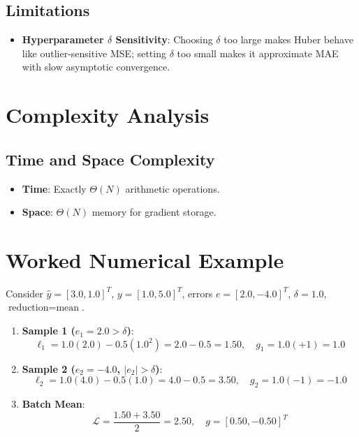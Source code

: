 \documentclass[11pt,a4paper]{article}
\theoremstyle{definition}
\begin{document}
\subsection{Limitations}
\begin{itemize}
    \item \textbf{Hyperparameter $\delta$ Sensitivity}: Choosing $\delta$ too large makes Huber behave like outlier-sensitive MSE; setting $\delta$ too small makes it approximate MAE with slow asymptotic convergence.
\end{itemize}

\section{Complexity Analysis}

\subsection{Time and Space Complexity}
\begin{itemize}
    \item \textbf{Time}: Exactly $\Theta(N)$ arithmetic operations.
    \item \textbf{Space}: $\Theta(N)$ memory for gradient storage.
\end{itemize}

\section{Worked Numerical Example}

Consider $\hat{y} = [3.0, 1.0]^T$, $y = [1.0, 5.0]^T$, errors $e = [2.0, -4.0]^T$, $\delta = 1.0$, $\text{reduction} = \text{mean}$.

\begin{enumerate}
    \item \textbf{Sample 1 ($e_1 = 2.0 > \delta$)}:
    \begin{equation}
    \ell_1 = 1.0(2.0) - 0.5(1.0^2) = 2.0 - 0.5 = 1.50, \quad g_1 = 1.0(+1) = 1.0
    \end{equation}
    \item \textbf{Sample 2 ($e_2 = -4.0$, $|e_2| > \delta$)}:
    \begin{equation}
    \ell_2 = 1.0(4.0) - 0.5(1.0) = 4.0 - 0.5 = 3.50, \quad g_2 = 1.0(-1) = -1.0
    \end{equation}
    \item \textbf{Batch Mean}:
    \begin{equation}
    \mathcal{L} = \frac{1.50 + 3.50}{2} = 2.50, \quad g = [0.50, -0.50]^T
    \end{equation}
\end{enumerate}
\end{document}
